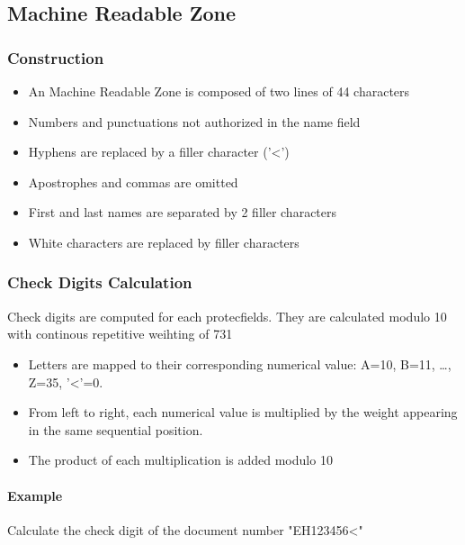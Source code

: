 
\subsection{Machine Readable Zone}

\subsubsection{Construction}
\begin{itemize}
    \item An Machine Readable Zone is composed of two lines of 44 characters
    \item Numbers and punctuations not authorized in the name field
    \item Hyphens are replaced by a filler character ('<')
    \item Apostrophes and commas are omitted
    \item First and last names are separated by 2 filler characters
    \item White characters are replaced by filler characters
\end{itemize}

\subsubsection{Check Digits Calculation}
Check digits are computed for each protecfields. They are calculated modulo 10
with continous repetitive weihting of 731
\begin{itemize}
    \item Letters are mapped to their corresponding numerical value:
    A=10, B=11, \ldots, Z=35, '<'=0.
    \item From left to right, each numerical value is multiplied by the weight
    appearing in the same sequential position.
    \item The product of each multiplication is added modulo 10
\end{itemize}

\paragraph{Example} Calculate the check digit of the document number "EH123456<"

